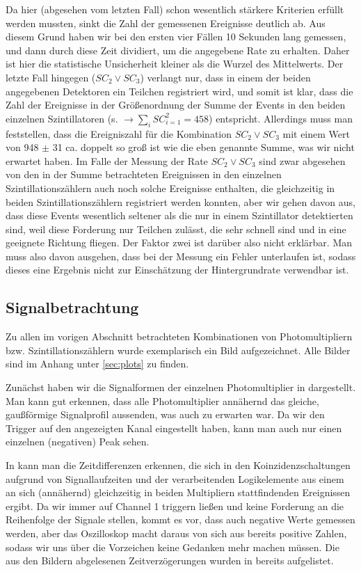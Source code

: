 Da hier (abgesehen vom letzten Fall) schon wesentlich stärkere Kriterien erfüllt
werden mussten, sinkt die Zahl der gemessenen Ereignisse deutlich ab. Aus
diesem Grund haben wir bei den ersten vier Fällen 10 Sekunden lang gemessen,
und dann durch diese Zeit dividiert, um die angegebene Rate zu erhalten. Daher
ist hier die statistische Unsicherheit kleiner als die Wurzel des Mittelwerts.
Der letzte Fall hingegen ($SC_2 \vee SC_3$) verlangt nur, dass in einem der
beiden angegebenen Detektoren ein Teilchen registriert wird, und somit ist
klar, dass die Zahl der Ereignisse in der Größenordnung der Summe der Events in
den beiden einzelnen Szintillatoren (s. 
$\rightarrow \sum_i SC_{i=1}^2 = 458 $) entspricht. Allerdings muss man
feststellen, 
dass die Ereigniszahl für die Kombination $SC_2 \vee SC_3$ mit einem Wert von
948 $\pm$ 31 ca. doppelt so groß ist wie die eben genannte Summe, was wir nicht
erwartet haben. Im Falle der Messung der Rate $SC_2 \vee SC_3$ sind zwar
abgesehen von den in der Summe betrachteten Ereignissen in den einzelnen
Szintillationszählern auch noch solche Ereignisse enthalten, die gleichzeitig
in beiden Szintillationszählern registriert werden konnten, aber wir gehen
davon aus, dass diese Events wesentlich seltener als die nur in einem
Szintillator detektierten sind, weil diese Forderung nur Teilchen zulässt, die
sehr schnell sind und in eine geeignete Richtung fliegen. Der Faktor zwei ist
darüber also nicht erklärbar. Man muss also davon ausgehen, dass bei der
Messung ein Fehler unterlaufen ist, sodass dieses eine Ergebnis nicht zur
Einschätzung der Hintergrundrate verwendbar ist.

\subsection{Signalbetrachtung}
Zu allen im vorigen Abschnitt betrachteten Kombinationen von Photomultipliern
bzw. Szintillationszählern wurde exemplarisch ein Bild aufgezeichnet. Alle
Bilder sind im Anhang unter \ref{sec:plots} zu finden.

Zunächst haben wir die Signalformen der einzelnen Photomultiplier in 
dargestellt. Man kann gut erkennen, dass alle Photomultiplier annähernd das
gleiche, gaußförmige Signalprofil aussenden, was auch zu erwarten war. Da wir
den Trigger auf den angezeigten Kanal eingestellt haben, kann man auch nur einen
einzelnen (negativen) Peak sehen.

In  kann man die Zeitdifferenzen erkennen, die sich in
den Koinzidenzschaltungen aufgrund von Signallaufzeiten und der verarbeitenden
Logikelemente aus einem an sich (annähernd) gleichzeitig in beiden Multipliern
stattfindenden Ereignissen ergibt. Da wir immer auf Channel 1 triggern ließen
und keine Forderung an die Reihenfolge der Signale stellen, kommt es vor, dass
auch negative Werte gemessen werden, aber das Oszilloskop macht daraus von sich
aus bereits positive Zahlen, sodass wir uns über die Vorzeichen keine Gedanken
mehr machen müssen. Die aus den Bildern abgelesenen Zeitverzögerungen wurden in
 bereits aufgelistet.


